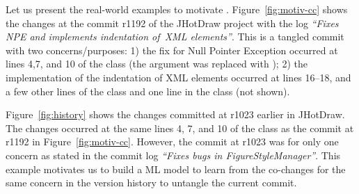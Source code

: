 
Let us present the real-world examples to motivate {\tool}.
Figure~\ref{fig:motiv-cc} shows the changes at the commit
r1192 of the JHotDraw project with the log {\em ``Fixes NPE and
  implements indentation of~XML elements''}. This is a tangled commit
with two concerns/purposes: 1) the fix for Null Pointer Exception
occurred at lines 4,7, and 10 of the  class (the
 argument was replaced with
); 2) the implementation of the indentation
of XML elements occurred at lines 16--18, and a few other lines of the
 class and one line in the  class (not
shown).

Figure~\ref{fig:history} shows the changes committed at r1023 earlier
in JHotDraw. The changes occurred at the same lines 4, 7, and 10 of
the  class as the commit at r1192 in
Figure~\ref{fig:motiv-cc}. However, the commit at r1023 was for only
one concern as stated in the commit log {\em ``Fixes bugs in
  FigureStyleManager''}. This example motivates us to build a ML model
to learn from the co-changes for the same concern in the version
history to untangle the current commit.


